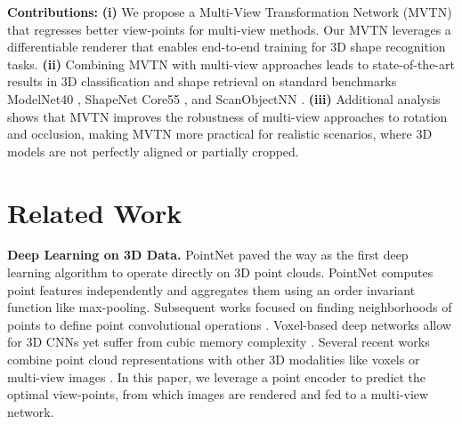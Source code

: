 \documentclass[10pt,twocolumn,letterpaper]{article}
\newcommand{\mysection}[1]{\noindent\textbf{#1.}}
\begin{document}
\vspace{2pt}\noindent\textbf{Contributions:} \textbf{(i)} We propose a Multi-View Transformation Network (MVTN) that regresses better view-points for multi-view methods. Our MVTN leverages a differentiable renderer that enables end-to-end training for 3D shape recognition tasks. 
\textbf{(ii)} Combining MVTN with multi-view approaches leads to state-of-the-art results in 3D classification and shape retrieval on standard benchmarks ModelNet40 \cite{modelnet}, ShapeNet Core55 \cite{shapenet,shrek17}, and ScanObjectNN \cite{scanobjectnn}. 
\textbf{(iii)} Additional analysis shows that MVTN improves the robustness of multi-view approaches to rotation and occlusion, making MVTN more practical for realistic scenarios, where 3D models are not perfectly aligned or partially cropped.


\section{Related Work} \label{sec:related}
\mysection{Deep Learning on 3D Data}
PointNet \cite{pointnet} paved the way as the first deep learning algorithm to operate directly on 3D point clouds. PointNet computes point features independently and aggregates them using an order invariant function like max-pooling. Subsequent works focused on finding neighborhoods of points to define point convolutional operations \cite{pointnet++,dgcn,pc_li2018pointcnn,pc_landrieu2018large,pc_landrieu2019point,pc_wang2018sgpn}.   
Voxel-based deep networks allow for 3D CNNs yet suffer from cubic memory complexity \cite{voxnet,minkosky,sparseconv}. Several recent works combine point cloud representations with other 3D modalities like voxels \cite{pvoxelcnn} or multi-view images \cite{pvnet,mvpnet}. In this paper, we leverage a point encoder to predict the optimal view-points, from which images are rendered and fed to a multi-view network.
\end{document}
